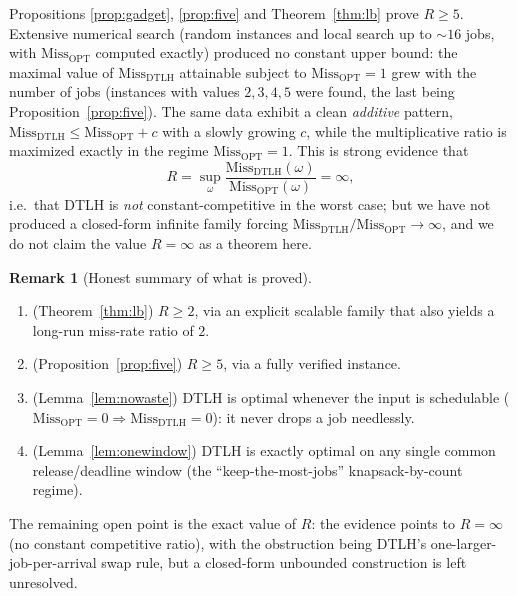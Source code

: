 \documentclass{amsart}
\theoremstyle{definition}
\newtheorem{remark}[theorem]{Remark}
\begin{document}
Propositions \ref{prop:gadget}, \ref{prop:five} and Theorem~\ref{thm:lb} prove
$R\ge 5$. Extensive numerical search (random instances and local search up to
$\sim 16$ jobs, with $\mathrm{Miss}_{\mathrm{OPT}}$ computed exactly) produced no
constant upper bound: the maximal value of $\mathrm{Miss}_{\mathrm{DTLH}}$
attainable subject to $\mathrm{Miss}_{\mathrm{OPT}}=1$ grew with the number of
jobs (instances with values $2,3,4,5$ were found, the last being
Proposition~\ref{prop:five}). The same data exhibit a clean \emph{additive}
pattern, $\mathrm{Miss}_{\mathrm{DTLH}}\le \mathrm{Miss}_{\mathrm{OPT}}+c$ with a
slowly growing $c$, while the multiplicative ratio is maximized exactly in the
regime $\mathrm{Miss}_{\mathrm{OPT}}=1$. This is strong evidence that
\[
R=\sup_\omega
\frac{\mathrm{Miss}_{\mathrm{DTLH}}(\omega)}{\mathrm{Miss}_{\mathrm{OPT}}(\omega)}
=\infty,
\]
i.e.\ that DTLH is \emph{not} constant-competitive in the worst case; but we have
not produced a closed-form infinite family forcing
$\mathrm{Miss}_{\mathrm{DTLH}}/\mathrm{Miss}_{\mathrm{OPT}}\to\infty$, and we do
not claim the value $R=\infty$ as a theorem here.

\begin{remark}[Honest summary of what is proved]
\begin{enumerate}
\item (Theorem~\ref{thm:lb}) $R\ge 2$, via an explicit scalable family that also
yields a long-run miss-rate ratio of $2$.
\item (Proposition~\ref{prop:five}) $R\ge 5$, via a fully verified instance.
\item (Lemma~\ref{lem:nowaste}) DTLH is optimal whenever the input is
schedulable ($\mathrm{Miss}_{\mathrm{OPT}}=0\Rightarrow
\mathrm{Miss}_{\mathrm{DTLH}}=0$): it never drops a job needlessly.
\item (Lemma~\ref{lem:onewindow}) DTLH is exactly optimal on any single common
release/deadline window (the ``keep-the-most-jobs'' knapsack-by-count regime).
\end{enumerate}
The remaining open point is the exact value of $R$: the evidence points to
$R=\infty$ (no constant competitive ratio), with the obstruction being DTLH's
one-larger-job-per-arrival swap rule, but a closed-form unbounded construction
is left unresolved.
\end{remark}
\end{document}
